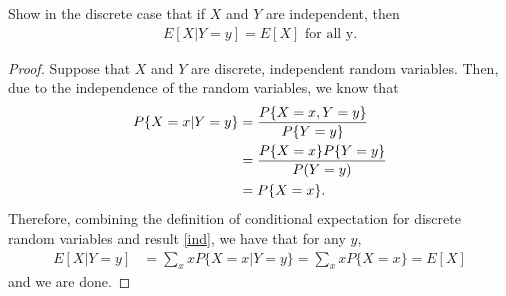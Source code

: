 \begin{problem}{3.9}
  Show in the discrete case that if $X$ and $Y$ are independent, then
  \begin{align*}
    E[X|Y=y] = E[X] \text{ for all y.}
  \end{align*}
\end{problem}

\begin{proof}
  Suppose that $X$ and $Y$ are discrete, independent random variables. Then, due to
  the independence of the random variables, we know that
  \begin{align}\label{ind}
    P\{X=x|Y=y\} &= \frac{P\{X=x, Y=y\}}{P\{Y=y\}} \notag\\
    &= \frac{P\{X=x\}P\{Y=y\}}{P(Y=y)} \notag\\
    &= P\{X=x\}.
  \end{align}
  Therefore, combining the definition of conditional expectation for discrete random variables
  and result \eqref{ind}, we have that for any $y$,
  \begin{align*}
    E[X|Y=y] &= \sum_x x P\{X=x | Y=y\} = \sum_x x P\{X=x\} = E[X]
  \end{align*}
  and we are done.
\end{proof}
\newpage
